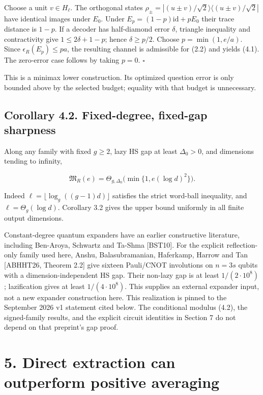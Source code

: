 \documentclass[11pt]{article}
\begin{document}
Choose a unit \(v\in H_\ell\). The orthogonal states
\(\rho_\pm=|(u\pm v)/\sqrt2\rangle\langle(u\pm v)/\sqrt2|\) have
identical images under \(E_0\). Under
\(E_p=(1-p)\mathrm{id}+pE_0\) their trace distance is \(1-p\).
If a decoder has half-diamond error \(\delta\), triangle inequality and
contractivity give \(1\le2\delta+1-p\); hence \(\delta\ge p/2\).
Choose \(p=\min(1,e/a)\). Since \(\epsilon_R(E_p)\le pa\), the resulting
channel is admissible for (2.2) and yields (4.1). The zero-error case follows
by taking \(p=0\). \hfill\(\square\)

This is a minimax lower construction. Its optimized question error is only
bounded above by the selected budget; equality with that budget is unnecessary.

\subsection*{Corollary 4.2. Fixed-degree, fixed-gap sharpness}

Along any family with fixed \(g\ge2\), lazy HS gap at least
\(\Delta_0>0\), and dimensions tending to infinity,

\[
\mathfrak M_R(e)=\Theta_{g,\Delta_0}
\bigl(\min\{1,e(\log d)^2\}\bigr).
\tag{4.2}
\]

Indeed \(\ell=\lfloor\log_g((g-1)d)\rfloor\) satisfies the strict
word-ball inequality, and \(\ell=\Theta_g(\log d)\). Corollary 3.2 gives
the upper bound uniformly in all finite output dimensions.

Constant-degree quantum expanders have an earlier constructive literature,
including Ben-Aroya, Schwartz and Ta-Shma [BST10]. For the explicit
reflection-only family used here, Anshu, Balasubramanian,
Haferkamp, Harrow and Tan [ABHHT26, Theorem 2.2] give sixteen Pauli/CNOT
involutions on \(n=3s\) qubits with a dimension-independent HS gap. Their
non-lazy gap is at least \(1/(2\cdot10^8)\); lazification gives at least
\(1/(4\cdot10^8)\). This supplies an external expander input, not a new
expander construction here. This realization is pinned to the September 2026
v1 statement cited below. The conditional modulus (4.2), the signed-family
results, and the explicit circuit identities in Section 7 do not depend on
that preprint's gap proof.

\section*{5. Direct extraction can outperform positive averaging}
\end{document}

